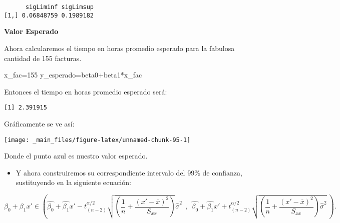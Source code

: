 \documentclass[
  a4paper,
  oneside,
  openany]{book}
\newenvironment{Shaded}{\begin{snugshade}}{\end{snugshade}}
\newcommand{\DecValTok}[1]{\textcolor[rgb]{0.00,0.00,0.81}{#1}}
\newcommand{\NormalTok}[1]{#1}
\newcommand{\OtherTok}[1]{\textcolor[rgb]{0.56,0.35,0.01}{#1}}
\newcommand{\SpecialCharTok}[1]{\textcolor[rgb]{0.00,0.00,0.00}{#1}}
\providecommand{\tightlist}{%
  \setlength{\itemsep}{0pt}\setlength{\parskip}{0pt}}
\begin{document}
\begin{verbatim}
      sigLiminf sigLimsup
[1,] 0.06848759 0.1989182
\end{verbatim}

\textbf{Valor Esperado}

Ahora calcularemos el tiempo en horas promedio esperado para la fabulosa cantidad de 155 facturas.

\begin{Shaded}
\begin{Highlighting}[]
\NormalTok{x\_fac}\OtherTok{=}\DecValTok{155}
\NormalTok{y\_esperado}\OtherTok{=}\NormalTok{beta0}\SpecialCharTok{+}\NormalTok{beta1}\SpecialCharTok{*}\NormalTok{x\_fac}
\end{Highlighting}
\end{Shaded}

Entonces el tiempo en horas promedio esperado será:

\begin{verbatim}
[1] 2.391915
\end{verbatim}

Gráficamente se ve así:

\begin{center}\texttt{[image: \_main\_files/figure-latex/unnamed-chunk-95-1]} \end{center}

Donde el punto azul es nuestro valor esperado.

\begin{itemize}
\tightlist
\item
  Y ahora construiremos su correspondiente intervalo del 99\% de confianza, sustituyendo en la siguiente ecuación:
\end{itemize}

\[\beta_{0}+\beta_{1}x' \in \left(\hat{\beta_{0}}+\hat{\beta_{1}}x'-t_{(n-2)}^{\alpha/2}\sqrt{\left( \frac{1}{n}+\frac{(x'-\overline{x})^2}{S_{xx}}\right)}\hat{\sigma}^2 \ \ , \ \ \hat{\beta_{0}}+\hat{\beta_{1}}x'+t_{(n-2)}^{\alpha/2}\sqrt{\left( \frac{1}{n}+\frac{(x'-\overline{x})^2}{S_{xx}}\right)\hat{\sigma}^2} \ \right).\]
\end{document}
